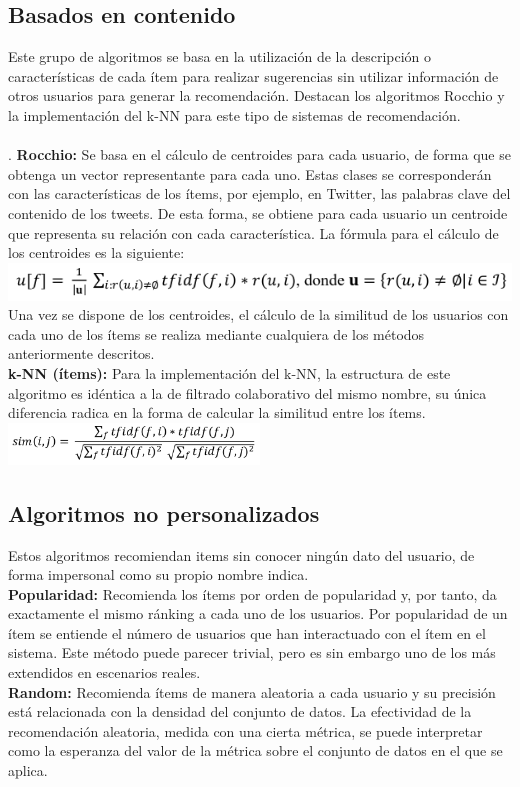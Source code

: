 \subsection{Basados en contenido}
Este grupo de algoritmos se basa en la utilización de la descripción o características de cada ítem para realizar sugerencias sin utilizar información de otros usuarios para generar la recomendación. Destacan los algoritmos Rocchio y la implementación del k-NN para este tipo de sistemas de recomendación.\\\\
.
\textbf{Rocchio:} Se basa en el cálculo de centroides para cada usuario, de forma que se obtenga un vector representante para cada uno. Estas clases se corresponderán con las características de los ítems, por ejemplo, en Twitter, las palabras clave del contenido de los tweets. De esta forma, se obtiene para cada usuario un centroide que representa su relación con cada característica. La fórmula para el cálculo de los centroides es la siguiente:\cite{13}\\
\includegraphics[width=\textwidth]{images/rocchio}
Una vez se dispone de los centroides, el cálculo de la similitud de los usuarios con cada uno de los ítems se realiza mediante cualquiera de los métodos anteriormente descritos. \\

\textbf{k-NN (ítems):} Para la implementación del k-NN, la estructura de este algoritmo es idéntica a la de filtrado colaborativo del mismo nombre, su única diferencia radica en la forma de calcular la similitud entre los ítems.\cite{13}\\
\includegraphics[width=0.5\textwidth]{images/knn_items}

\subsection{Algoritmos no personalizados}
Estos algoritmos recomiendan items sin conocer ningún dato del usuario, de forma impersonal como su propio nombre indica. \\

\textbf{Popularidad:} Recomienda los ítems por orden de popularidad y, por tanto, da exactamente el mismo ránking a cada uno de los usuarios. Por popularidad de un ítem se entiende el número de usuarios que han interactuado con el ítem en el sistema. Este método puede parecer trivial, pero es sin embargo uno de los más extendidos en escenarios reales.\\
\newpage
\textbf{Random:} Recomienda ítems de manera aleatoria a cada usuario y su precisión está relacionada con la densidad del conjunto de datos. La efectividad de la recomendación aleatoria, medida con una cierta métrica, se puede interpretar como la esperanza del valor de la métrica sobre el conjunto de datos en el que se aplica. \cite{14}\\\\

